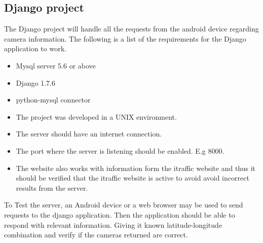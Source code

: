 \documentclass{article}
\begin{document}
\subsection{Django project}
The Django project will handle all the requests from the android device regarding camera information. The following is a list of the requirements for the Django application to work.
\begin{itemize}
\item Mysql server 5.6 or above
\item Django 1.7.6
\item python-mysql connector
\item The project was developed in a UNIX environment.
\item The server should have an internet connection.
\item The port where the server is listening should be enabled. E.g 8000.
\item The website also works with information form the itraffic website and thus it should be verified that the itraffic website is active to avoid avoid incorrect results from the server.
\end{itemize}
To Test the server, an Android device or a web browser may be used to send requests to the django application. Then the application should be able to respond with relevant information. Giving it known latitude-longitude combination and verify if the cameras returned are correct.
\end{document}
